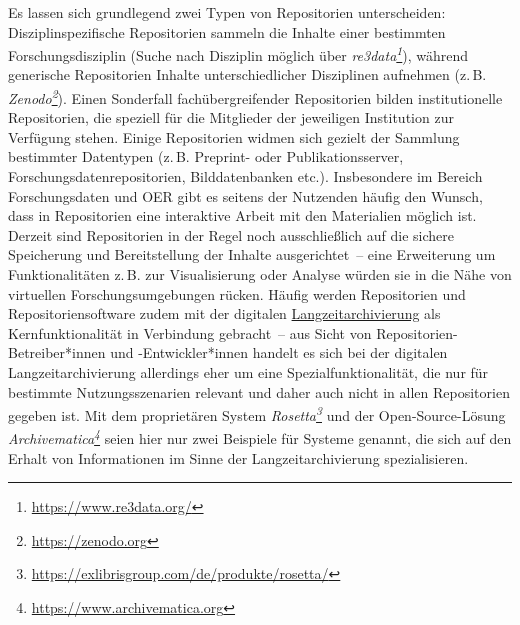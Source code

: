 \documentclass[
  11pt,
  letterpaper,
  DIV=11,
  twoside]{scrreprt}
\DeclareRobustCommand{\href}[2]{#2\footnote{\url{#1}}}
\begin{document}
Es lassen sich grundlegend zwei Typen von Repositorien unterscheiden:
Disziplinspezifische Repositorien sammeln die Inhalte einer bestimmten
Forschungsdisziplin (Suche nach Disziplin möglich über
\emph{\href{https://www.re3data.org/}{re3data}}), während generische
Repositorien Inhalte unterschiedlicher Disziplinen aufnehmen (z.\,B.
\emph{\href{https://zenodo.org}{Zenodo}}). Einen Sonderfall
fachübergreifender Repositorien bilden institutionelle Repositorien, die
speziell für die Mitglieder der jeweiligen Institution zur Verfügung
stehen. Einige Repositorien widmen sich gezielt der Sammlung bestimmter
Datentypen (z.\,B. Preprint- oder Publikationsserver,
Forschungsdatenrepositorien, Bilddatenbanken etc.). Insbesondere im
Bereich Forschungsdaten und OER gibt es seitens der Nutzenden häufig den
Wunsch, dass in Repositorien eine interaktive Arbeit mit den Materialien
möglich ist. Derzeit sind Repositorien in der Regel noch ausschließlich
auf die sichere Speicherung und Bereitstellung der Inhalte
ausgerichtet~-- eine Erweiterung um Funktionalitäten z.\,B. zur
Visualisierung oder Analyse würden sie in die Nähe von virtuellen
Forschungsumgebungen rücken. Häufig werden Repositorien und
Repositoriensoftware zudem mit der digitalen
\hyperref[langzeitarchivierung]{Langzeitarchivierung} als
Kernfunktionalität in Verbindung gebracht~-- aus Sicht von
Repositorien-Betreiber*innen und -Entwickler*innen handelt es sich bei
der digitalen Langzeitarchivierung allerdings eher um eine
Spezialfunktionalität, die nur für bestimmte Nutzungsszenarien relevant
und daher auch nicht in allen Repositorien gegeben ist. Mit dem
proprietären System
\emph{\href{https://exlibrisgroup.com/de/produkte/rosetta/}{Rosetta}}
und der Open-Source-Lösung
\emph{\href{https://www.archivematica.org}{Archivematica}} seien hier
nur zwei Beispiele für Systeme genannt, die sich auf den Erhalt von
Informationen im Sinne der Langzeitarchivierung spezialisieren.
\end{document}
